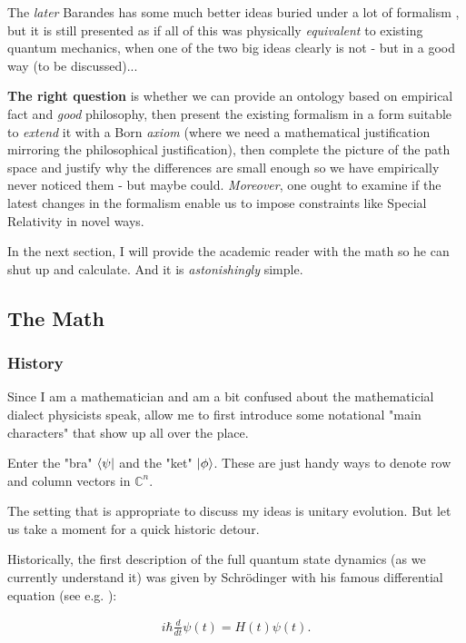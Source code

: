 \documentclass{article}
\begin{document}
The \textit{later} Barandes has some much better ideas buried under a lot of formalism \cite{Barandes_2025}, but it is still presented as if all of this was physically \textit{equivalent} to existing quantum mechanics, when one of the two big ideas clearly is not - but in a good way (to be discussed)...

\textbf{The right question} is whether we can provide an ontology based on empirical fact and \textit{good} philosophy, then present the existing formalism in a form suitable to \textit{extend} it with a Born \textit{axiom} (where we need a mathematical justification mirroring the philosophical justification), then complete the picture of the path space and justify why the differences are small enough so we have empirically never noticed them - but maybe could. \textit{Moreover}, one ought to examine if the latest changes in the formalism enable us to impose constraints like Special Relativity in novel ways.

In the next section, I will provide the academic reader with the math so he can shut up and calculate. And it is \textit{astonishingly} simple.


\subsection{The Math}

\subsubsection{History}

Since I am a mathematician and am a bit confused about the mathematicial dialect physicists speak, allow me to first introduce some notational "main characters" that show up all over the place.

Enter the "bra" $\bra{\psi}$ and the "ket" $\ket{\phi}$. These are just handy ways to denote row and column vectors in $\mathbb{C}^n$.

The setting that is appropriate to discuss my ideas is unitary evolution. But let us take a moment for a quick historic detour.

Historically, the first description of the full quantum state dynamics (as we currently understand it) was given by Schrödinger with his famous differential equation (see e.g. \cite{Lecture25}):

\begin{align*}
i\hbar \frac{d}{d t}\psi(t) = H(t)\psi(t).
\end{align*}
\end{document}
